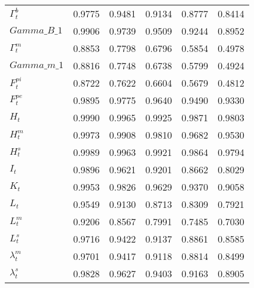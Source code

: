 \begin{center}
\begin{longtable}{lccccc}
$ \Gamma^b_t                $	 & 	        0.9775	 & 	        0.9481	 & 	        0.9134	 & 	        0.8777	 & 	        0.8414 \\ 
$Gamma\_B\_1                $	 & 	        0.9906	 & 	        0.9739	 & 	        0.9509	 & 	        0.9244	 & 	        0.8952 \\ 
$ \Gamma^m_t                $	 & 	        0.8853	 & 	        0.7798	 & 	        0.6796	 & 	        0.5854	 & 	        0.4978 \\ 
$Gamma\_m\_1                $	 & 	        0.8816	 & 	        0.7748	 & 	        0.6738	 & 	        0.5799	 & 	        0.4924 \\ 
$ F^{pi}_t                  $	 & 	        0.8722	 & 	        0.7622	 & 	        0.6604	 & 	        0.5679	 & 	        0.4812 \\ 
$ F^{pe}_t                  $	 & 	        0.9895	 & 	        0.9775	 & 	        0.9640	 & 	        0.9490	 & 	        0.9330 \\ 
$ H_t                       $	 & 	        0.9990	 & 	        0.9965	 & 	        0.9925	 & 	        0.9871	 & 	        0.9803 \\ 
$ H^m_t                     $	 & 	        0.9973	 & 	        0.9908	 & 	        0.9810	 & 	        0.9682	 & 	        0.9530 \\ 
$ H^s_t                     $	 & 	        0.9989	 & 	        0.9963	 & 	        0.9921	 & 	        0.9864	 & 	        0.9794 \\ 
$ I_t                       $	 & 	        0.9896	 & 	        0.9621	 & 	        0.9201	 & 	        0.8662	 & 	        0.8029 \\ 
$ K_t                       $	 & 	        0.9953	 & 	        0.9826	 & 	        0.9629	 & 	        0.9370	 & 	        0.9058 \\ 
$ L_t                       $	 & 	        0.9549	 & 	        0.9130	 & 	        0.8713	 & 	        0.8309	 & 	        0.7921 \\ 
$ L^m_t                     $	 & 	        0.9206	 & 	        0.8567	 & 	        0.7991	 & 	        0.7485	 & 	        0.7030 \\ 
$ L^s_t                     $	 & 	        0.9716	 & 	        0.9422	 & 	        0.9137	 & 	        0.8861	 & 	        0.8585 \\ 
$ \lambda^m_t               $	 & 	        0.9701	 & 	        0.9417	 & 	        0.9118	 & 	        0.8814	 & 	        0.8499 \\ 
$ \lambda^s_t               $	 & 	        0.9828	 & 	        0.9627	 & 	        0.9403	 & 	        0.9163	 & 	        0.8905 \\ 

\end{longtable}
\end{center}
